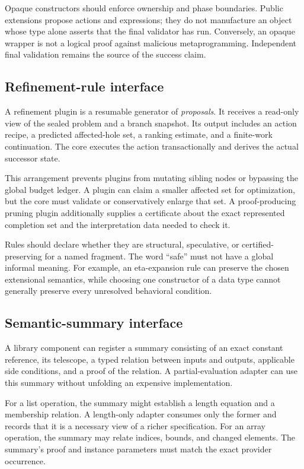 \documentclass[11pt,letterpaper]{article}
\theoremstyle{definition}
\theoremstyle{remark}
\begin{document}
Opaque constructors should enforce ownership and phase boundaries. Public extensions propose actions and expressions; they do not manufacture an object whose type alone asserts that the final validator has run. Conversely, an opaque wrapper is not a logical proof against malicious metaprogramming. Independent final validation remains the source of the success claim.

\subsection{Refinement-rule interface}

A refinement plugin is a resumable generator of \emph{proposals}. It receives a read-only view of the sealed problem and a branch snapshot. Its output includes an action recipe, a predicted affected-hole set, a ranking estimate, and a finite-work continuation. The core executes the action transactionally and derives the actual successor state.

This arrangement prevents plugins from mutating sibling nodes or bypassing the global budget ledger. A plugin can claim a smaller affected set for optimization, but the core must validate or conservatively enlarge that set. A proof-producing pruning plugin additionally supplies a certificate about the exact represented completion set and the interpretation data needed to check it.

Rules should declare whether they are structural, speculative, or certified-preserving for a named fragment. The word ``safe'' must not have a global informal meaning. For example, an eta-expansion rule can preserve the chosen extensional semantics, while choosing one constructor of a data type cannot generally preserve every unresolved behavioral condition.

\subsection{Semantic-summary interface}

A library component can register a summary consisting of an exact constant reference, its telescope, a typed relation between inputs and outputs, applicable side conditions, and a proof of the relation. A partial-evaluation adapter can use this summary without unfolding an expensive implementation.

For a list operation, the summary might establish a length equation and a membership relation. A length-only adapter consumes only the former and records that it is a necessary view of a richer specification. For an array operation, the summary may relate indices, bounds, and changed elements. The summary's proof and instance parameters must match the exact provider occurrence.
\end{document}
